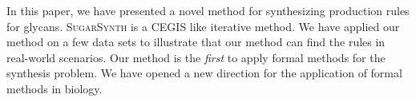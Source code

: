 % 
In this paper, we have presented a novel method for synthesizing production rules for glycans.
\textsc{SugarSynth} is a CEGIS like iterative method.
We have applied our method on a few data sets to illustrate that our method
can find the rules in real-world scenarios.
Our method is the {\em first} to apply formal methods for the synthesis problem.
We have opened a new direction for the application of formal methods in biology.





